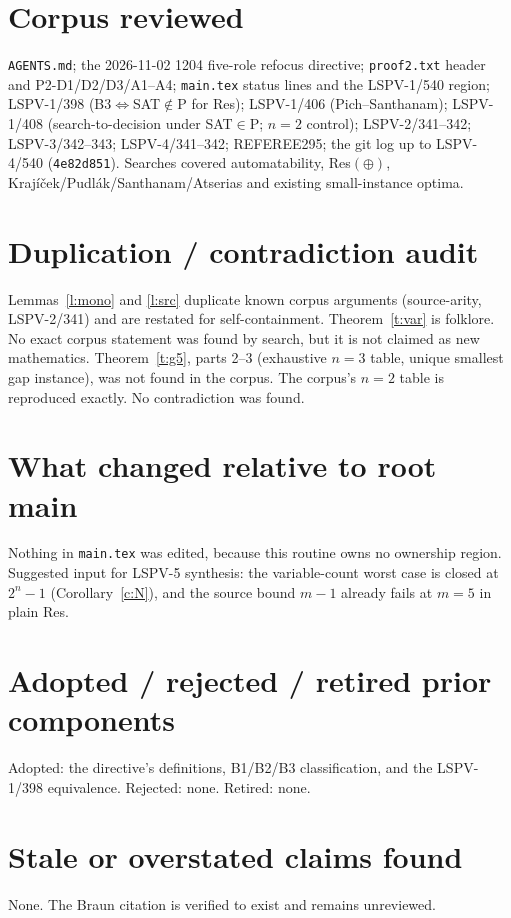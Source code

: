 \documentclass[11pt]{article}
\begin{document}
\section*{Corpus reviewed}
\texttt{AGENTS.md}; the 2026-11-02 1204 five-role refocus directive; \texttt{proof2.txt} header and P2-D1/D2/D3/A1--A4; \texttt{main.tex}
status lines and the LSPV-1/540 region; LSPV-1/398 (B3$\Leftrightarrow$SAT$\notin$P for Res); LSPV-1/406 (Pich--Santhanam); LSPV-1/408
(search-to-decision under SAT$\in$P; $n=2$ control); LSPV-2/341--342; LSPV-3/342--343; LSPV-4/341--342; REFEREE295; the git log up to
LSPV-4/540 (\texttt{4e82d851}). Searches covered automatability, Res$(\oplus)$, Krajíček/Pudlák/Santhanam/Atserias and existing
small-instance optima.

\section*{Duplication / contradiction audit}
Lemmas~\ref{l:mono} and \ref{l:src} duplicate known corpus arguments (source-arity, LSPV-2/341) and are restated for self-containment.
Theorem~\ref{t:var} is folklore. No exact corpus statement was found by search, but it is not claimed as new mathematics.
Theorem~\ref{t:g5}, parts 2--3 (exhaustive $n=3$ table, unique smallest gap instance), was not found in the corpus. The corpus's
$n=2$ table is reproduced exactly. No contradiction was found.

\section*{What changed relative to root main}
Nothing in \texttt{main.tex} was edited, because this routine owns no ownership region. Suggested input for LSPV-5 synthesis: the
variable-count worst case is closed at $2^n-1$ (Corollary~\ref{c:N}), and the source bound $m-1$ already fails at $m=5$ in plain Res.

\section*{Adopted / rejected / retired prior components}
Adopted: the directive's definitions, B1/B2/B3 classification, and the LSPV-1/398 equivalence. Rejected: none. Retired: none.

\section*{Stale or overstated claims found}
None. The Braun citation is verified to exist and remains unreviewed.
\end{document}

